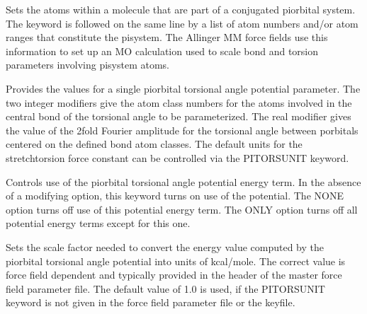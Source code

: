 \documentclass[letterpaper,11pt,english]{sphinxmanual}
\begin{document}
\ignorespaces {}\label{\detokenize{text/keywords:key-pisystem}}\begin{description}
\sphinxAtStartPar
Sets the atoms within a molecule that are part of a conjugated pi\sphinxhyphen{}orbital system. The keyword is followed on the same line by a list of atom numbers and/or atom ranges that constitute the pi\sphinxhyphen{}system. The Allinger MM force fields use this information to set up an MO calculation used to scale bond and torsion parameters involving pi\sphinxhyphen{}system atoms.

\end{description}

\ignorespaces {}\label{\detokenize{text/keywords:key-pitors}}\begin{description}
\sphinxAtStartPar
Provides the values for a single pi\sphinxhyphen{}orbital torsional angle potential parameter. The two integer modifiers give the atom class numbers for the atoms involved in the central bond of the torsional angle to be parameterized. The real modifier gives the value of the 2\sphinxhyphen{}fold Fourier amplitude for the torsional angle between p\sphinxhyphen{}orbitals centered on the defined bond atom classes. The default units for the stretch\sphinxhyphen{}torsion force constant can be controlled via the PITORSUNIT keyword.

\end{description}

\ignorespaces {}\label{\detokenize{text/keywords:key-pitorsterm}}\begin{description}
\sphinxAtStartPar
Controls use of the pi\sphinxhyphen{}orbital torsional angle potential energy term. In the absence of a modifying option, this keyword turns on use of the potential. The NONE option turns off use of this potential energy term. The ONLY option turns off all potential energy terms except for this one.

\end{description}

\ignorespaces {}\label{\detokenize{text/keywords:key-pitorsunit}}\begin{description}
\sphinxAtStartPar
Sets the scale factor needed to convert the energy value computed by the pi\sphinxhyphen{}orbital torsional angle potential into units of kcal/mole. The correct value is force field dependent and typically provided in the header of the master force field parameter file. The default value of 1.0 is used, if the PITORSUNIT keyword is not given in the force field parameter file or the keyfile.

\end{description}
\end{document}
